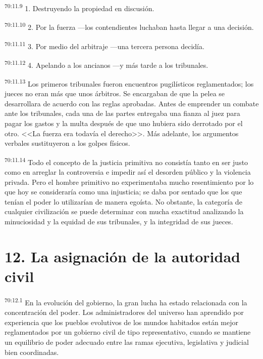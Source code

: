 \par
\textsuperscript{70:11.9} 1. Destruyendo la propiedad en discusión.

\par
\textsuperscript{70:11.10} 2. Por la fuerza ---los contendientes luchaban hasta llegar a una decisión.

\par
\textsuperscript{70:11.11} 3. Por medio del arbitraje ---una tercera persona decidía.

\par
\textsuperscript{70:11.12} 4. Apelando a los ancianos ---y más tarde a los tribunales.

\par
\textsuperscript{70:11.13} Los primeros tribunales fueron encuentros pugilísticos reglamentados; los jueces no eran más que unos árbitros. Se encargaban de que la pelea se desarrollara de acuerdo con las reglas aprobadas. Antes de emprender un combate ante los tribunales, cada una de las partes entregaba una fianza al juez para pagar los gastos y la multa después de que uno hubiera sido derrotado por el otro. <<La fuerza era todavía el derecho>>. Más adelante, los argumentos verbales sustituyeron a los golpes físicos.

\par
\textsuperscript{70:11.14} Todo el concepto de la justicia primitiva no consistía tanto en ser justo como en arreglar la controversia e impedir así el desorden público y la violencia privada. Pero el hombre primitivo no experimentaba mucho resentimiento por lo que hoy se consideraría como una injusticia; se daba por sentado que los que tenían el poder lo utilizarían de manera egoísta. No obstante, la categoría de cualquier civilización se puede determinar con mucha exactitud analizando la minuciosidad y la equidad de sus tribunales, y la integridad de sus jueces.

\section*{12. La asignación de la autoridad civil}
\par
\textsuperscript{70:12.1} En la evolución del gobierno, la gran lucha ha estado relacionada con la concentración del poder. Los administradores del universo han aprendido por experiencia que los pueblos evolutivos de los mundos habitados están mejor reglamentados por un gobierno civil de tipo representativo, cuando se mantiene un equilibrio de poder adecuado entre las ramas ejecutiva, legislativa y judicial bien coordinadas.

